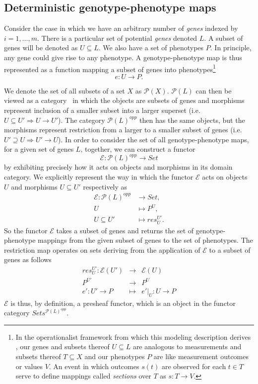 \subsection{Deterministic genotype-phenotype maps}
Consider the case in which we have an arbitrary number of \emph{genes} indexed by $i=1, \ldots, m$. There is a particular set of potential \emph{genes} denoted $L$. A subset of genes will be denoted as $U \subseteq L$. We also have a set of phenotypes $P$. In principle, any gene could give rise to any phenotype. A genotype-phenotype map is thus represented as a function mapping a subset of genes into phenotypes\footnote{In the operationalist framework from which this modeling description derives \cite{Abramsky2011}, our genes and subsets thereof $U \subseteq L$ are analogous to measurements and subsets thereof $T \subseteq X$ and our phenotypes $P$ are like measurement outcomes or values $V$. An event in which outcomes $s(t)$ are observed for each $t \in T$ serve to define mappings called \emph{sections} over $T$ as $s \colon T \rightarrow V$.}
$$
e \colon U \rightarrow  P.
$$

We denote the set of all subsets of a set $X$ as $\mathcal{P}(X)$. $\mathcal{P}(L)$ can then be viewed as a category~\cite{Lane1998,MacLane1992,Awodey2006} in which the objects are subsets of genes and morphisms represent inclusion of a smaller subset into a larger superset (i.e. $U \subseteq U' \Rightarrow U \rightarrow U'$). The category $\mathcal{P}(L)^{opp}$ then has the same objects, but the morphisms represent restriction from a larger to a smaller subset of genes (i.e. $U' \supseteq U \Rightarrow U' \rightarrow U$). In order to consider the set of all genotype-phenotype maps, for a given set of genes $L$, together, we can construct a functor
$$
\mathcal{E} \colon \mathcal{P}(L)^{opp} \rightarrow Set
$$
by exhibiting precisely how it acts on objects and morphisms in its domain category. We explicitly represent the way in which the functor $\mathcal{E}$ acts on objects $U$ and morphisms $U \subseteq U'$ respectively as
\begin{equation}\label{eq:gpfunctor}
\begin{split}
\mathcal{E} \colon \mathcal{P}(L)^{opp} &\rightarrow Set,\\
U &\mapsto P^U,\\
U \subseteq U' &\mapsto res^{U'}_{U}.
\end{split}
\end{equation}
So the functor $\mathcal{E}$ takes a subset of genes and returns the set of genotype-phenotype mappings from the given subset of genes to the set of phenotypes. The restriction map operates on sets deriving from the application of $\mathcal{E}$ to a subset of genes as follows
\begin{eqnarray*}
res^{U'}_{U} \colon \mathcal{E}(U') &\rightarrow& \mathcal{E}(U)\\
P^{U'} &\rightarrow& P^U\\
e' \colon U' \rightarrow P &\mapsto& e'|_U \colon U \rightarrow P
\end{eqnarray*}
$\mathcal{E}$ is thus, by definition, a presheaf functor, which is an object in the functor category $Sets^{\mathcal{P}(L)^{opp}}$.

